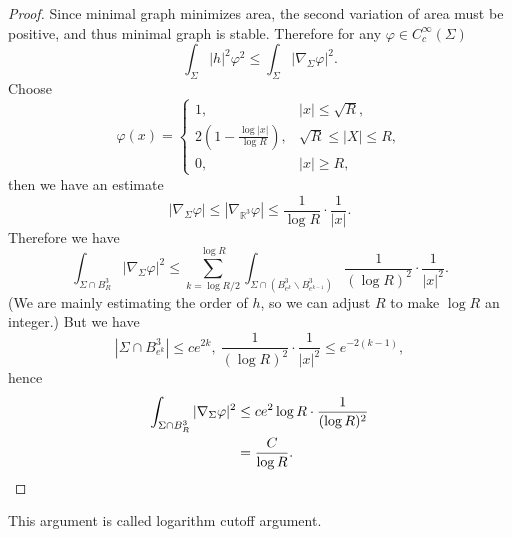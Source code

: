 \begin{proof}
    Since minimal graph minimizes area, the second variation of area must be positive, and thus minimal graph is stable.
    Therefore for any $\varphi\in C^\infty_c(\Sigma)$
    \[\int_\Sigma|h|^2\varphi^2\leq\int_\Sigma|\nabla_\Sigma\varphi|^2.\]
    Choose
    \[\varphi(x)=\begin{cases}
        1, & |x|\leq\sqrt{R},\\
        2\left(1-\frac{\log|x|}{\log{R}}\right), & \sqrt{R}\leq|X|\leq R,\\
        0, & |x|\geq R,
    \end{cases}\]
    then we have an estimate
    \[|\nabla_\Sigma\varphi|\leq|\nabla_{\mathbb{R}^3}\varphi|\leq\frac{1}{\log{R}}\cdot\frac{1}{|x|}.\]
    Therefore we have
    \[\int_{\Sigma\cap B^3_R}|\nabla_\Sigma\varphi|^2\leq\sum_{k=\log{R}/2}^{\log{R}}\int_{\Sigma\cap(B^3_{e^k}\backslash B^3_{e^{k-1}})}\frac{1}{(\log{R})^2}\cdot\frac{1}{|x|^2}.\]
    (We are mainly estimating the order of $h$, so we can adjust $R$ to make $\log{R}$ an integer.)
    But we have
    \[|\Sigma\cap B^3_{e^k}|\leq ce^{2k},\ \frac{1}{(\log{R})^2}\cdot\frac{1}{|x|^2}\leq e^{-2(k-1)},\]
    hence
    \begin{align*}
        \int_{\Sigma\cap B^3_R}|\nabla_\Sigma\varphi|^2&\leq ce^2\log{R}\cdot\frac{1}{(\log{R})^2}\\
        &=\frac{C}{\log{R}}.\qedhere
    \end{align*}
\end{proof}
\begin{rem}
    This argument is called logarithm cutoff argument.
\end{rem}

